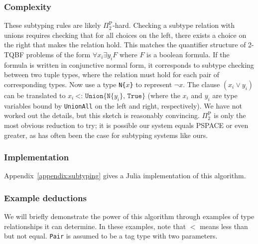

\subsubsection{Complexity}

These subtyping rules are likely $\Pi_2^{\textrm{P}}$-hard.
Checking a subtype relation with unions requires checking that for all choices
on the left, there exists a choice on the right that makes the relation hold.
This matches the quantifier structure of 2-TQBF problems of the form
$\forall x_i \exists y_i F$ where $F$ is a boolean formula.
If the formula is written in conjunctive normal form, it corresponds to subtype
checking between two tuple types, where the relation must hold for each pair of
corresponding types.
Now use a type \texttt{N\{}$x$\texttt{\}} to represent $\neg x$.
The clause $(x_i \vee y_i)$ can be translated to
$x_i\ \texttt{<:\ Union\{N\{}y_i\texttt{\}, True\}}$ (where the $x_i$ and
$y_i$ are type variables bound by \texttt{UnionAll} on the left and right,
respectively).
We have not worked out the details, but this sketch is reasonably
convincing.
$\Pi_2^{\textrm{P}}$ is only the most obvious reduction to try; it is possible our
system equals PSPACE or even greater, as has often been the case for subtyping
systems like ours.

\subsubsection{Implementation}

Appendix~\ref{appendix:subtyping} gives a Julia implementation of this
algorithm.

\subsubsection{Example deductions}

We will briefly demonstrate the power of this algorithm through examples of
type relationships it can determine.
In these examples, note that $<$ means less than but not equal.
\texttt{Pair} is assumed to be a tag type with two parameters.


